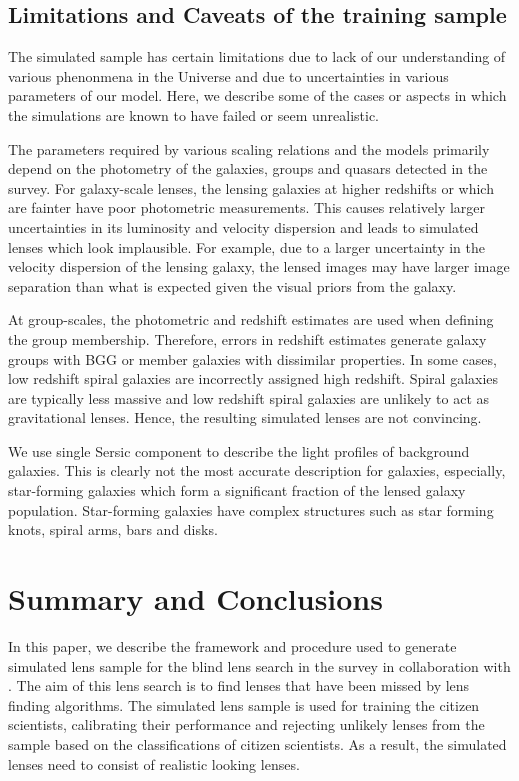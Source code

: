 \documentclass[useAMS,usenatbib,a4paper]{mn2e}
\begin{document}
\subsection{Limitations and Caveats of the training sample}
The simulated sample has certain limitations due to lack of our understanding of
various phenonmena in the Universe and due to uncertainties in various
parameters of our model. Here, we describe some of the cases or aspects in which the
simulations are known to have failed or seem unrealistic. 

The parameters required by various scaling relations and the models primarily
depend on the photometry of the galaxies, groups and quasars detected in the
survey. For galaxy-scale lenses, the lensing galaxies at higher redshifts or
which are fainter have poor photometric measurements. This causes relatively
larger uncertainties in its luminosity and velocity dispersion and leads to
simulated lenses which look implausible. For example, due to a larger
uncertainty in the velocity dispersion of the lensing galaxy, the lensed images
may have larger image separation than what is expected given the visual priors
from the galaxy.

At group-scales, the photometric and redshift estimates are used when
defining the group membership. Therefore, errors in redshift estimates generate
galaxy groups with BGG or member galaxies with dissimilar properties. In some
cases, low redshift spiral galaxies are incorrectly assigned high redshift.
Spiral galaxies are typically less massive and low redshift spiral galaxies are
unlikely to act as gravitational lenses. Hence, the resulting simulated lenses
are not convincing.

We use single Sersic component to describe the light profiles of background
galaxies. This is clearly not the most accurate description for galaxies,
especially, star-forming galaxies which form a significant fraction of the
lensed galaxy population. Star-forming galaxies have complex structures such as
star forming knots, spiral arms, bars and disks. 


\section{Summary and Conclusions}
\label{sec:conclude}
In this paper, we describe the framework and procedure used to generate
simulated lens sample for the blind lens search in the \cfhtls survey in
collaboration with \sw. The aim of this lens search is to find lenses that have
been missed by lens finding algorithms. The simulated lens sample is used for
training the citizen scientists, calibrating their performance and rejecting
unlikely lenses from the sample based on the classifications of citizen
scientists. As a result, the simulated lenses need to consist of realistic
looking lenses.
\end{document}

